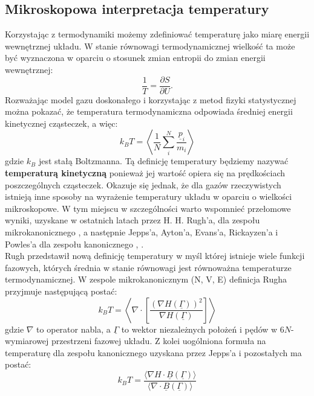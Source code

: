 \documentclass[12pt,a4paper,openright]{report} %
\begin{document}
\subsection{Mikroskopowa interpretacja temperatury}
Korzystając z termodynamiki możemy zdefiniować temperaturę jako miarę energii wewnętrznej układu. W stanie równowagi termodynamicznej wielkość ta może być wyznaczona w oparciu o stosunek zmian entropii do zmian energii wewnętrznej:
\begin{equation}
\frac{1}{T}=\frac{\partial S}{\partial U}.
\end{equation}
Rozważając model gazu doskonałego i korzystając z metod fizyki statystycznej można pokazać, że temperatura termodynamiczna odpowiada średniej energii kinetycznej cząsteczek, a więc:
\begin{equation}
k_B T=\left< \frac{1}{N} \sum \limits_{i}^{N} \frac{\underline{p}_i}{m_i} \right>
\label{eq:TK}
\end{equation}
gdzie $k_B$ jest stałą Boltzmanna. Tą definicję temperatury będziemy nazywać \textbf{temperaturą kinetyczną} ponieważ jej wartość opiera się na prędkościach poszczególnych cząsteczek. Okazuje się jednak, że dla gazów rzeczywistych istnieją inne sposoby na wyrażenie temperatury układu w oparciu o wielkości mikroskopowe. W tym miejscu w szczególności warto wspomnieć przełomowe wyniki, uzyskane w ostatnich latach przez H. H. Rugh'a, dla zespołu mikrokanonicznego \cite{Rugh1997}, a następnie Jepps'a, Ayton'a, Evans'a, Rickayzen'a i Powles'a dla zespołu kanonicznego \cite{Jepps2000}, \cite{Rickayzen2001}. \\
Rugh przedstawił nową definicję temperatury w myśl której istnieje wiele funkcji fazowych, których średnia w stanie równowagi jest równoważna temperaturze termodynamicznej. W zespole mikrokanonicznym (N, V, E) definicja Rugha przyjmuje następującą postać:
\begin{equation}
%
k_B T=\left< \nabla \cdot \left[ \frac{(\nabla H(\underline{\Gamma}))^2}{\nabla H(\underline{\Gamma})}  \right] \right>
%
\end{equation}
gdzie $\nabla$ to operator nabla, a $\underline{\Gamma}$ to wektor niezależnych położeń i pędów w $6N$-wymiarowej przestrzeni fazowej układu. Z kolei uogólniona formuła na temperaturę dla zespołu kanonicznego uzyskana przez Jepps'a i pozostałych ma postać:
\begin{equation}
k_B T=\frac{\langle \nabla H \cdot \underline{B}(\underline{\Gamma}) \rangle}{\langle \nabla \cdot \underline{B}(\underline{\Gamma})\rangle}
\label{eq:TU2}
\end{equation}
\end{document}
